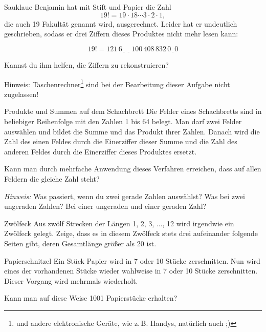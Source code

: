 \documentclass{uebungszettel}
\begin{document}

\begin{aufgabe}{Sauklaue}
  Benjamin hat mit Stift und Papier die Zahl
    \[ 19! = 19 \cdot 18 \cdots 3 \cdot 2 \cdot 1, \]
  die auch 19 Fakultät genannt wird, ausgerechnet. Leider hat er undeutlich geschrieben, sodass er drei Ziffern dieses Produktes nicht mehr lesen kann:

  \[ 19! = 121 \, 6 \underline{\,\,\,} \, \underline{\,\,\,} \, 100 \, 408 \, 832 \, 0 \underline{\,\,\,} 0 \]

  Kannst du ihm helfen, die Ziffern zu rekonstruieren?

  Hinweis: Taschenrechner\footnote{und andere elektronische Geräte, wie z.\,B. Handys, natürlich auch ;)} sind bei der Bearbeitung dieser Aufgabe nicht zugelassen!
\end{aufgabe}

\begin{aufgabe}{Produkte und Summen auf dem Schachbrett}
Die Felder eines Schachbretts sind in beliebiger Reihenfolge mit den Zahlen 1 bis 64 belegt. Man darf zwei Felder auswählen und bildet die Summe und das Produkt ihrer Zahlen. Danach wird die Zahl des einen Feldes durch die Einerziffer dieser Summe und die Zahl des anderen Feldes durch die Einerziffer dieses Produktes ersetzt. 

Kann man durch mehrfache Anwendung dieses Verfahren erreichen, dass auf allen Feldern die gleiche Zahl steht?

\emph{Hinweis: } Was passiert, wenn du zwei gerade Zahlen auswählst? Was bei zwei ungeraden Zahlen? Bei einer ungeraden und einer geraden Zahl?
\end{aufgabe}

\begin{aufgabe}{Zwölfeck}
  Aus zwölf Strecken der Längen 1, 2, 3, ..., 12 wird irgendwie ein Zwölfeck gelegt. Zeige, dass es in diesem Zwölfeck stets drei aufeinander folgende Seiten gibt, deren Gesamtlänge größer als 20 ist.
\end{aufgabe}

\begin{aufgabe}{Papierschnitzel}
  Ein Stück Papier wird in 7 oder 10 Stücke zerschnitten. Nun wird eines der vorhandenen Stücke wieder wahlweise in 7 oder 10 Stücke zerschnitten. Dieser Vorgang wird mehrmals wiederholt.

  Kann man auf diese Weise 1001 Papierstücke erhalten?
\end{aufgabe}
\end{document}
